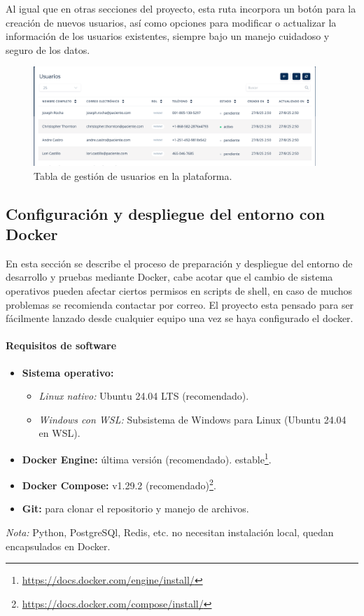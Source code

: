 \documentclass[12pt, a4paper]{article}
\begin{document}
\begin{umaappendices}
Al igual que en otras secciones del proyecto, esta ruta incorpora un botón para la creación de nuevos usuarios, así como opciones para modificar o actualizar la información de los usuarios existentes, siempre bajo un manejo cuidadoso y seguro de los datos.
\vspace{-5pt}
\begin{figure}[htbp]
	\centering
	\includegraphics[width=0.95\textwidth]{images/14}
	\caption[Ejemplo]{Tabla de gestión de usuarios en la plataforma.}
	\label{fig:usuari}
\end{figure}


	
	\subsection{Configuración y despliegue del entorno con Docker}
	\label{sec:deploy_docker}
	
	En esta sección se describe el proceso de preparación y despliegue del entorno de desarrollo y pruebas mediante Docker, cabe acotar que el cambio de sistema operativos pueden afectar ciertos permisos en scripts de shell, en caso de muchos problemas se recomienda contactar por correo. El proyecto esta pensado para ser fácilmente lanzado desde cualquier equipo una vez se haya configurado el docker.
	
	\paragraph{Requisitos de software}
	\begin{itemize}
		\item \textbf{Sistema operativo:}
		\begin{itemize}
			\item \emph{Linux nativo:} Ubuntu 24.04 LTS (recomendado).  
			\item \emph{Windows con WSL:} Subsistema de Windows para Linux (Ubuntu 24.04 en WSL).  
		\end{itemize}
		\item \textbf{Docker Engine:} última versión (recomendado). estable\footnote{\url{https://docs.docker.com/engine/install/}}.  
		\item \textbf{Docker Compose:} v1.29.2 (recomendado)\footnote{\url{https://docs.docker.com/compose/install/}}.  
		\item \textbf{Git:} para clonar el repositorio y manejo de archivos.  
	\end{itemize}
	\emph{Nota:} Python, PostgreSQl, Redis, etc. no necesitan instalación local, quedan encapsulados en Docker.
	

\end{umaappendices}
\end{document}
